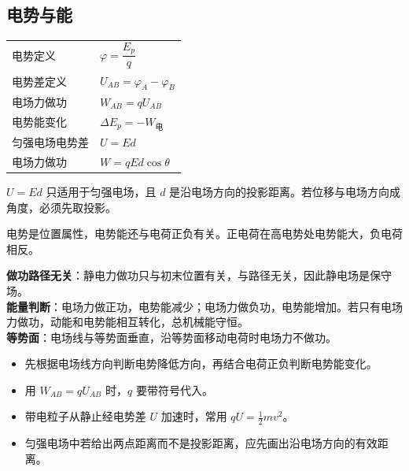 
\subsection{电势与能}

\begin{tabularx}{\columnwidth}{XX}
  电势定义&$\varphi=\dfrac{E_p}{q}$\\
  电势差定义&$U_{AB}=\varphi_A-\varphi_B$\\
  电场力做功&$W_{AB}=qU_{AB}$\\
  电势能变化&$\Delta E_p=-W_{\text{电}}$\\
  匀强电场电势差&$U=Ed$\\
  电场力做功&$W=qEd\cos\theta$\\
\end{tabularx}

\begin{formulanotebox}
$U=Ed$ 只适用于匀强电场，且 $d$ 是沿电场方向的投影距离。若位移与电场方向成角度，必须先取投影。

电势是位置属性，电势能还与电荷正负有关。正电荷在高电势处电势能大，负电荷相反。
\end{formulanotebox}

\begin{keypointbox}[title={\strut\textcolor{white}{\bfseries 重点知识点：电势与做功}}]
\textbf{做功路径无关}：静电力做功只与初末位置有关，与路径无关，因此静电场是保守场。\\

\textbf{能量判断}：电场力做正功，电势能减少；电场力做负功，电势能增加。若只有电场力做功，动能和电势能相互转化，总机械能守恒。\\

\textbf{等势面}：电场线与等势面垂直，沿等势面移动电荷时电场力不做功。
\end{keypointbox}

\begin{casetypebox}[title={\strut\textcolor{white}{\bfseries 常见题型：电势高低与能量变化}}]
\begin{itemize}[leftmargin=1.5em]
  \item 先根据电场线方向判断电势降低方向，再结合电荷正负判断电势能变化。
  \item 用 $W_{AB}=qU_{AB}$ 时，$q$ 要带符号代入。
  \item 带电粒子从静止经电势差 $U$ 加速时，常用 $qU=\frac12mv^2$。
  \item 匀强电场中若给出两点距离而不是投影距离，应先画出沿电场方向的有效距离。
\end{itemize}
\end{casetypebox}
